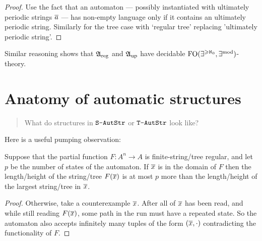 \begin{proof}
Use the fact that an automaton --- possibly instantiated with ultimately periodic strings $\mbox{$\overline {a}$}$ --- has non-empty language only if it contains an ultimately periodic string. Similarly for the tree case with `regular tree' replacing 'ultimately periodic string'. 
\end{proof}



Similar reasoning shows that $\mathfrak{A}_{\rm{reg}}$ and $\mathfrak{A}_{\rm{up}}$ have decidable $\mbox{\rm FO}(\exists^{\geqslant \aleph_0},\exists^{\rm mod})$-theory.




\section{Anatomy of automatic structures}



\begin{quote}
What do structures in $\mbox{\tt S-AutStr}$ or $\mbox{\tt T-AutStr}$ look like?
\end{quote}
Here is a useful pumping observation:



\begin{proposition} \label{AS:prop:locfin} \cite{KhNe95}
Suppose that the partial function $F:A^n \to A$ is finite-string/tree regular, and let $p$ be the number of states of the automaton.
If $\mbox{$\overline {x}$}$ is in the domain of $F$ then the length/height of the string/tree $F(\mbox{$\overline {x}$})$ is at most $p$ more than the length/height of the largest string/tree in $\mbox{$\overline {x}$}$.
\end{proposition}

\begin{proof}
Otherwise, take a counterexample  $\mbox{$\overline {x}$}$.
After all of $\mbox{$\overline {x}$}$ has been read, and while still reading $F(\mbox{$\overline {x}$})$, some path in the run must have a repeated state. 
So the automaton also accepts infinitely many tuples of the form $(\mbox{$\overline {x}$}, \cdot)$ contradicting the functionality of $F$.
\end{proof}

